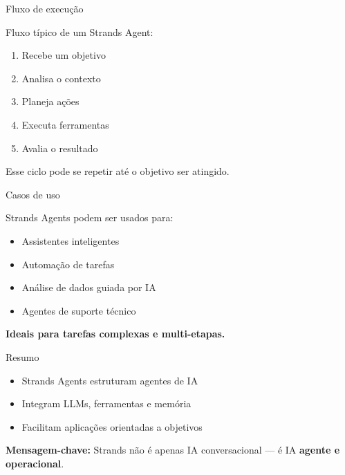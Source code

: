 \documentclass{beamer}
\begin{document}
\begin{frame}{Fluxo de execução}
    
    Fluxo típico de um Strands Agent:
    \begin{enumerate}
        \item Recebe um objetivo
        \item Analisa o contexto
        \item Planeja ações
        \item Executa ferramentas
        \item Avalia o resultado
    \end{enumerate}
    
    \vspace{0.3cm}
    
    Esse ciclo pode se repetir até o objetivo ser atingido.
    
\end{frame}

\begin{frame}{Casos de uso}
    
    Strands Agents podem ser usados para:
    \begin{itemize}
        \item Assistentes inteligentes
        \item Automação de tarefas
        \item Análise de dados guiada por IA
        \item Agentes de suporte técnico
    \end{itemize}
    
    \vspace{0.3cm}
    
    \textbf{Ideais para tarefas complexas e multi-etapas.}
    
\end{frame}

\begin{frame}{Resumo}
    
    \begin{itemize}
        \item Strands Agents estruturam agentes de IA
        \item Integram LLMs, ferramentas e memória
        \item Facilitam aplicações orientadas a objetivos
    \end{itemize}
    
    \vspace{0.3cm}
    
    \textbf{Mensagem-chave:}  
    Strands não é apenas IA conversacional —  
    é IA \textbf{agente e operacional}.
    
\end{frame}
\end{document}
